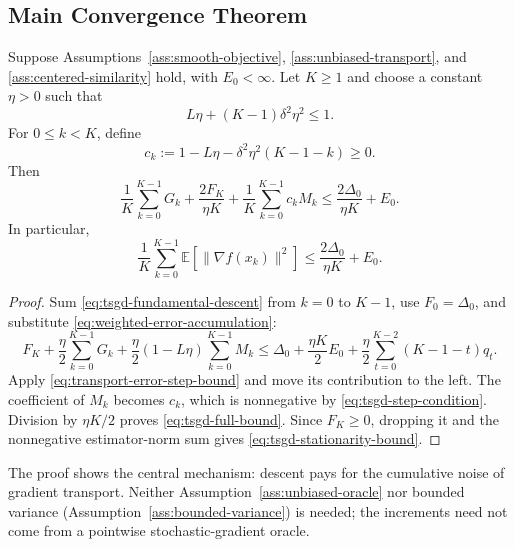 \subsection{Main Convergence Theorem}
\label{subsec:main-tsgd-theorem}

\begin{mdframed}[
  linecolor=black!55,
  linewidth=0.7pt,
  innerleftmargin=10pt,
  innerrightmargin=10pt,
  innertopmargin=8pt,
  innerbottommargin=8pt
]
\begin{theorem}
\label{thm:tsgd-stationarity}
Suppose Assumptions~\ref{ass:smooth-objective},
\ref{ass:unbiased-transport}, and \ref{ass:centered-similarity} hold,
with $E_0<\infty$. Let $K\geq1$ and choose a constant $\eta>0$ such that
\begin{equation}
\label{eq:tsgd-step-condition}
\boxed{L\eta+(K-1)\delta^2\eta^2\leq1.}
\end{equation}
For $0\leq k<K$, define
\[
c_k:=1-L\eta-\delta^2\eta^2(K-1-k)\geq0.
\]
Then
\begin{equation}
\label{eq:tsgd-full-bound}
\frac1K\sum_{k=0}^{K-1}G_k
+\frac{2F_K}{\eta K}
+\frac1K\sum_{k=0}^{K-1}c_kM_k
\leq\frac{2\Delta_0}{\eta K}+E_0.
\end{equation}
In particular,
\begin{equation}
\label{eq:tsgd-stationarity-bound}
\boxed{\frac1K\sum_{k=0}^{K-1}
\mathbb{E}[\|\nabla f(x_k)\|^2]
\leq\frac{2\Delta_0}{\eta K}+E_0.}
\end{equation}
\end{theorem}
\end{mdframed}

\begin{proof}
Sum \eqref{eq:tsgd-fundamental-descent} from $k=0$ to $K-1$, use
$F_0=\Delta_0$, and substitute \eqref{eq:weighted-error-accumulation}:
\[
F_K+\frac{\eta}{2}\sum_{k=0}^{K-1}G_k
+\frac{\eta}{2}(1-L\eta)\sum_{k=0}^{K-1}M_k
\leq\Delta_0+\frac{\eta K}{2}E_0
+\frac{\eta}{2}\sum_{t=0}^{K-2}(K-1-t)q_t.
\]
Apply \eqref{eq:transport-error-step-bound} and move its contribution
to the left. The coefficient of $M_k$ becomes $c_k$, which is
nonnegative by \eqref{eq:tsgd-step-condition}. Division by
$\eta K/2$ proves \eqref{eq:tsgd-full-bound}. Since $F_K\geq0$, dropping
it and the nonnegative estimator-norm sum gives
\eqref{eq:tsgd-stationarity-bound}.
\end{proof}

The proof shows the central mechanism: descent pays for the cumulative
noise of gradient transport. Neither Assumption~\ref{ass:unbiased-oracle}
nor bounded variance (Assumption~\ref{ass:bounded-variance}) is needed;
the increments need not come from a pointwise stochastic-gradient oracle.

